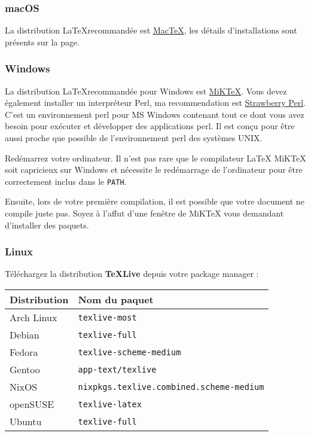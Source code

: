 \documentclass[A4paper
]{article}
\begin{document}
\hypertarget{macos}{%
\subsubsection{macOS}\label{macos}}

La distribution \LaTeX recommandée est
\href{https://tug.org/mactex/}{MacTeX}, les détails d'installations sont
présents sur la page.

\hypertarget{windows}{%
\subsubsection{Windows}\label{windows}}

La distribution \LaTeX recommandée pour Windows est
\href{https://miktex.org}{MiKTeX}. Vous devez également installer un
interpréteur Perl, ma recommendation est
\href{https://strawberryperl.com}{Strawberry Perl}. C'est un
environnement perl pour MS Windows contenant tout ce dont vous avez
besoin pour exécuter et développer des applications perl. Il est conçu
pour être aussi proche que possible de l'environnement perl des systèmes
UNIX.

Redémarrez votre ordinateur. Il n'est pas rare que le compilateur \LaTeX
MiKTeX soit capricieux sur Windows et nécessite le redémarrage de
l'ordinateur pour être correctement inclus dans le \texttt{PATH}.

Ensuite, lors de votre première compilation, il est possible que votre
document ne compile juste pas. Soyez à l'affut d'une fenêtre de MiKTeX
vous demandant d'installer des paquets.

\hypertarget{linux}{%
\subsubsection{Linux}\label{linux}}

Téléchargez la distribution \textbf{\TeX Live} depuis votre package
manager :

\begin{longtable}[]{@{}ll@{}}
\toprule
Distribution & Nom du paquet \\
\midrule
\endhead
Arch Linux & \texttt{texlive-most} \\
Debian & \texttt{texlive-full} \\
Fedora & \texttt{texlive-scheme-medium} \\
Gentoo & \texttt{app-text/texlive} \\
NixOS & \texttt{nixpkgs.texlive.combined.scheme-medium} \\
openSUSE & \texttt{texlive-latex} \\
Ubuntu & \texttt{texlive-full} \\
\bottomrule
\end{longtable}
\end{document}

